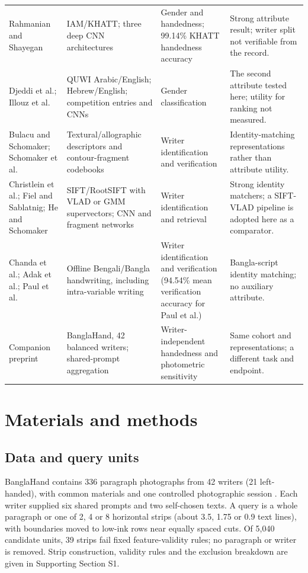 \begin{table}[!t]
\begin{tabularx}{\textwidth}{@{}>{\raggedright\arraybackslash}p{}>{\raggedright\arraybackslash}p{}>{\raggedright\arraybackslash}p{}>{\raggedright\arraybackslash}X@{}}
Rahmanian and Shayegan \cite{rahmanian2021handedness} & IAM/KHATT; three deep CNN architectures & Gender and handedness; 99.14\% KHATT handedness accuracy & Strong attribute result; writer split not verifiable from the record.\\
Djeddi et al.; Illouz et al.\ \cite{djeddi2015icdar,illouz2018gender} & QUWI Arabic/English; Hebrew/English; competition entries and CNNs & Gender classification & The second attribute tested here; utility for ranking not measured.\\
Bulacu and Schomaker; Schomaker et al.\ \cite{bulacu2007text,schomaker2007codebooks} & Textural/allographic descriptors and contour-fragment codebooks & Writer identification and verification & Identity-matching representations rather than attribute utility.\\
Christlein et al.; Fiel and Sablatnig; He and Schomaker \cite{christlein2017gmm,christlein2017unsupervised,fiel2015cnn,he2020fragnet} & SIFT/RootSIFT with VLAD or GMM supervectors; CNN and fragment networks & Writer identification and retrieval & Strong identity matchers; a SIFT-VLAD pipeline is adopted here as a comparator.\\
Chanda et al.; Adak et al.; Paul et al.\ \cite{chanda2010bengali,adak2019intravariable,paul2024bangla} & Offline Bengali/Bangla handwriting, including intra-variable writing & Writer identification and verification (94.54\% mean verification accuracy for Paul et al.) & Bangla-script identity matching; no auxiliary attribute.\\
Companion preprint \cite{prappo2026handedness} & BanglaHand, 42 balanced writers; shared-prompt aggregation & Writer-independent handedness and photometric sensitivity & Same cohort and representations; a different task and endpoint.\\\bottomrule
\end{tabularx}
\end{table}

\section{Materials and methods}
\label{sec:protocol}
\subsection{Data and query units}
BanglaHand contains 336 paragraph photographs from 42 writers (21 left-handed), with common materials and one controlled photographic session \cite{banglahand2026data}. Each writer supplied six shared prompts and two self-chosen texts. A query is a whole paragraph or one of 2, 4 or 8 horizontal strips (about 3.5, 1.75 or 0.9 text lines), with boundaries moved to low-ink rows near equally spaced cuts. Of 5,040 candidate units, 39 strips fail fixed feature-validity rules; no paragraph or writer is removed. Strip construction, validity rules and the exclusion breakdown are given in Supporting Section S1.

